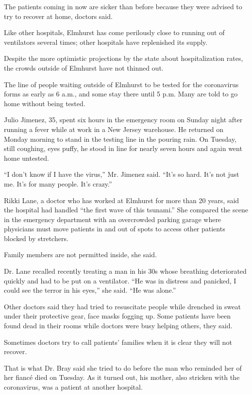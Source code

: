 The patients coming in now are sicker than before because they were
advised to try to recover at home, doctors said.

Like other hospitals, Elmhurst has come perilously close to running out
of ventilators several times; other hospitals have replenished its
supply.

Despite the more optimistic projections by the state about
hospitalization rates, the crowds outside of Elmhurst have not thinned
out.

The line of people waiting outside of Elmhurst to be tested for the
coronavirus forms as early as 6 a.m., and some stay there until 5 p.m.
Many are told to go home without being tested.

Julio Jimenez, 35, spent six hours in the emergency room on Sunday night
after running a fever while at work in a New Jersey warehouse. He
returned on Monday morning to stand in the testing line in the pouring
rain. On Tuesday, still coughing, eyes puffy, he stood in line for
nearly seven hours and again went home untested.

``I don't know if I have the virus,'' Mr. Jimenez said. ``It's so hard.
It's not just me. It's for many people. It's crazy.''

Rikki Lane, a doctor who has worked at Elmhurst for more than 20 years,
said the hospital had handled ``the first wave of this tsunami.'' She
compared the scene in the emergency department with an overcrowded
parking garage where physicians must move patients in and out of spots
to access other patients blocked by stretchers.

Family members are not permitted inside, she said.

Dr. Lane recalled recently treating a man in his 30s whose breathing
deteriorated quickly and had to be put on a ventilator. ``He was in
distress and panicked, I could see the terror in his eyes,'' she said.
``He was alone.''

Other doctors said they had tried to resuscitate people while drenched
in sweat under their protective gear, face masks fogging up. Some
patients have been found dead in their rooms while doctors were busy
helping others, they said.

Sometimes doctors try to call patients' families when it is clear they
will not recover.

That is what Dr. Bray said she tried to do before the man who reminded
her of her fiancé died on Tuesday. As it turned out, his mother, also
stricken with the coronavirus, was a patient at another hospital.

